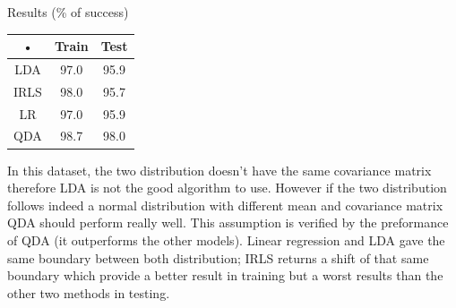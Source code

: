 \documentclass[a4paper]{article}
\begin{document}
\begin{minipage}[c]{0,35\textwidth}
Results (\% of success)\\
\begin{tabular}{|c|c|c|}
\hline 
• & Train & Test \\ 
\hline 
LDA & 97.0 & 95.9 \\ 
\hline 
IRLS & 98.0 & 95.7 \\ 
\hline 
LR & 97.0 & 95.9 \\ 
\hline 
QDA & 98.7 & 98.0 \\ 
\hline 
\end{tabular} 
\end{minipage}
\begin{minipage}{0,6\textwidth}
In this dataset, the two distribution doesn't have the same covariance matrix therefore LDA is not the good algorithm to use. However if the two distribution follows indeed a normal distribution with different mean and covariance matrix QDA should perform really well. This assumption is verified by the preformance of QDA (it outperforms the other models). Linear regression and LDA gave the same boundary between both distribution; IRLS returns a shift of that same boundary which provide a better result in training but a worst results than the other two methods in testing.
\end{minipage}
\newpage
\end{document}
